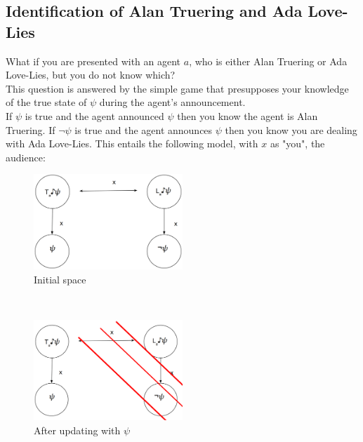 \documentclass[12pt, titlepage, twoside, a4paper]{report}
\begin{document}
\subsection{Identification of Alan Truering and Ada Love-Lies}
What if you are presented with an agent $a$, who is either Alan Truering or Ada Love-Lies, but you do not know which?\\
This question is answered by the simple game that presupposes your knowledge of the true state of $\psi$ during the agent's announcement.\\
If $\psi$ is true and the agent announced $\psi$ then you know the agent is Alan Truering. If $\neg \psi$ is true and the agent announces $\psi$ then you know you are dealing with Ada Love-Lies.
This entails the following model, with $x$ as "you", the audience:
\begin{figure}[h!]
  \centering
  \includegraphics[width=0.5\textwidth]{slide10.eps}
  \caption{Initial space}
\end{figure}\\
\begin{figure}[h!]
  \centering
  \includegraphics[width=0.5\textwidth]{slide11.eps}
  \caption{After updating with $\psi$}
\end{figure}
\newpage
\end{document}
